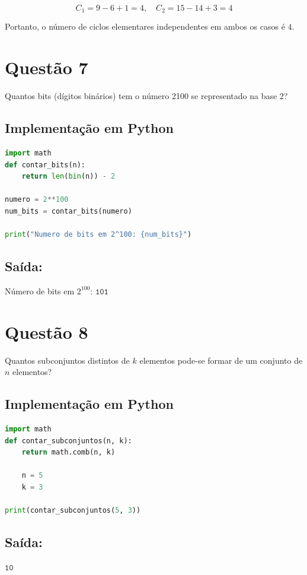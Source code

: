 \[
C_{\text{1}} = 9 - 6 + 1 = 4, \quad C_{\text{2}} = 15 - 14 + 3 = 4
\]

Portanto, o número de ciclos elementares independentes em ambos os casos é \(\boxed{4}\).

\section*{Questão 7}
Quantos bits (dígitos binários) tem o número 2100 se representado na base 2?

\vspace{10pt}

\subsection*{Implementação em Python}
\begin{lstlisting}[language=Python]
import math
def contar_bits(n):
    return len(bin(n)) - 2

numero = 2**100
num_bits = contar_bits(numero)

print("Numero de bits em 2^100: {num_bits}")
\end{lstlisting}

\subsection*{Saída:}
Número de bits em $2^{100}$: \(\boxed{\texttt{101}}\)

\section*{Questão 8}

Quantos subconjuntos distintos de \( k \) elementos pode-se formar de um conjunto de \( n \) elementos?

\subsection*{Implementação em Python}
\begin{lstlisting}[language=Python]
import math
def contar_subconjuntos(n, k):
    return math.comb(n, k)

    n = 5
    k = 3

print(contar_subconjuntos(5, 3))
\end{lstlisting}

\subsection*{Saída:}
\(\boxed{\texttt{10}}\)

